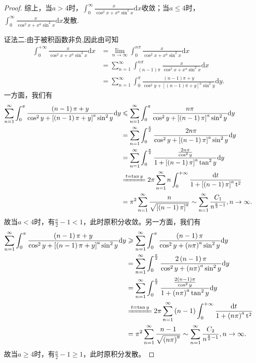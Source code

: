 \documentclass[../../main.tex]{subfiles}
\begin{document}
\begin{proof}
综上，当$a>4$时，$\int_0^{\infty}\frac{x}{\cos^2x+x^a\sin^2x}\mathrm{d}x$收敛；当$a\leqslant 4$时，$\int_0^{\infty}\frac{x}{\cos^2x+x^a\sin^2x}\mathrm{d}x$发散.

{\color{blue}证法二:}由于被积函数非负,因此由可知
\begin{align*}
\int_0^{+\infty}{\frac{x}{\cos ^2x+x^a\sin ^2x}\mathrm{d}x}&=\underset{n\rightarrow \infty}{\lim}\int_0^{n\pi}{\frac{x}{\cos ^2x+x^a\sin ^2x}\mathrm{d}x}
\\
&=\sum_{n=1}^{\infty}{\int_{\left( n-1 \right) \pi}^{n\pi}{\frac{x}{\cos ^2x+x^a\sin ^2x}\mathrm{d}x}}
\\
&=\sum_{n=1}^{\infty}{\int_0^{\pi}{\frac{\left( n-1 \right) \pi +y}{\cos ^2y+\left[ \left( n-1 \right) \pi +y \right] ^a\sin ^2y}\mathrm{d}y}}.
\end{align*}
一方面，我们有
\begin{align*}
\sum_{n=1}^{\infty}{\int_0^{\pi}{\frac{\left( n-1 \right) \pi +y}{\cos ^2y+\left[ \left( n-1 \right) \pi +y \right] ^a\sin ^2y}\mathrm{d}y}}&\leqslant \sum_{n=1}^{\infty}{\int_0^{\pi}{\frac{n\pi}{\cos ^2y+\left[ \left( n-1 \right) \pi \right] ^a\sin ^2y}\mathrm{d}y}}\\
&=\sum_{n=1}^{\infty}{\int_0^{\frac{\pi}{2}}{\frac{2n\pi}{\cos ^2y+\left[ \left( n-1 \right) \pi \right] ^a\sin ^2y}\mathrm{d}y}}\\
&=\sum_{n=1}^{\infty}{\int_0^{\frac{\pi}{2}}{\frac{\frac{2n\pi}{\cos ^2y}}{1+\left[ \left( n-1 \right) \pi \right] ^a\tan ^2y}\mathrm{d}y}}
\\
&\xlongequal{t=\tan y}2\pi \sum_{n=1}^{\infty}{n\int_0^{+\infty}{\frac{\mathrm{d}t}{1+\left[ \left( n-1 \right) \pi \right] ^a\mathrm{t}^2}}}\\
&=\pi ^2\sum_{n=1}^{\infty}{\frac{n}{\sqrt{\left[ \left( n-1 \right) \pi \right] ^a}}}\sim \sum_{n=1}^{\infty}{\frac{C_1}{n^{\frac{a}{2}-1}}},n\rightarrow \infty .
\end{align*}
故当$a<4$时，有$\frac{a}{2}-1<1$，此时原积分收敛。另一方面，我们有
\begin{align*}
\sum_{n=1}^{\infty}{\int_0^{\pi}{\frac{\left( n-1 \right) \pi +y}{\cos ^2y+\left[ \left( n-1 \right) \pi +y \right] ^a\sin ^2y}\mathrm{d}y}}&\geqslant \sum_{n=1}^{\infty}{\int_0^{\pi}{\frac{\left( n-1 \right) \pi}{\cos ^2y+\left( n\pi \right) ^a\sin ^2y}\mathrm{d}y}}\\
&=\sum_{n=1}^{\infty}{\int_0^{\frac{\pi}{2}}{\frac{2\left( n-1 \right) \pi}{\cos ^2y+\left( n\pi \right) ^a\sin ^2y}\mathrm{d}y}}\\
&=\sum_{n=1}^{\infty}{\int_0^{\frac{\pi}{2}}{\frac{\frac{2\left( n-1 \right) \pi}{\cos ^2y}}{1+\left( n\pi \right) ^a\tan ^2y}\mathrm{d}y}}\\
&\xlongequal{t=\tan y}2\pi \sum_{n=1}^{\infty}{\left( n-1 \right) \int_0^{+\infty}{\frac{\mathrm{d}t}{1+\left( n\pi \right) ^a\mathrm{t}^2}}}\\
&=\pi ^2\sum_{n=1}^{\infty}{\frac{n-1}{\sqrt{\left( n\pi \right) ^a}}}\sim \sum_{n=1}^{\infty}{\frac{C_2}{n^{\frac{a}{2}-1}}},n\rightarrow \infty .
\end{align*}
故当$a\geqslant 4$时，有$\frac{a}{2}-1\geqslant 1$，此时原积分发散。


\end{proof}
\end{document}
